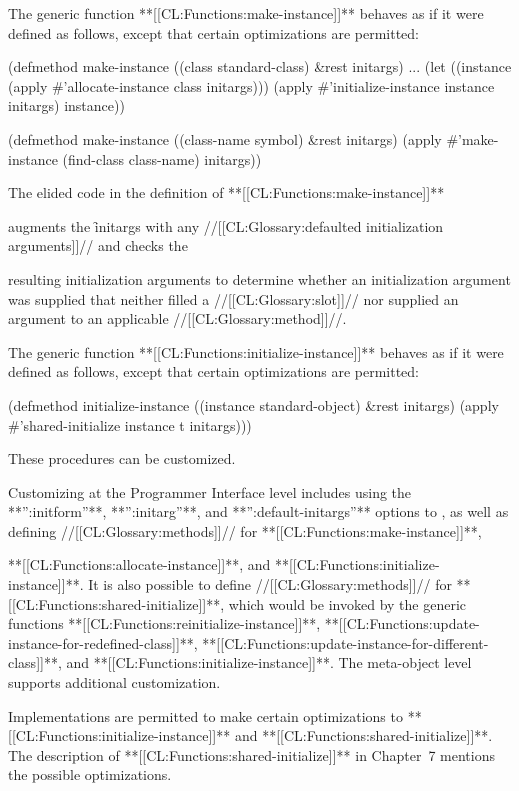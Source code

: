 \endsubsection%

                       The generic function **[[CL:Functions:make-instance]]** behaves as if it were defined as follows, except that certain optimizations are permitted:

\code
 (defmethod make-instance ((class standard-class) &rest initargs)
   ...
   (let ((instance (apply #'allocate-instance class initargs)))
     (apply #'initialize-instance instance initargs)
     instance))

 (defmethod make-instance ((class-name symbol) &rest initargs)
   (apply #'make-instance (find-class class-name) initargs)) \endcode

                                       The elided code in the definition of **[[CL:Functions:make-instance]]** 

augments the \f{initargs} with any //[[CL:Glossary:defaulted initialization arguments]]// and checks the

resulting initialization arguments to determine whether an initialization argument was supplied that neither filled a //[[CL:Glossary:slot]]// nor supplied an argument to an applicable //[[CL:Glossary:method]]//. 

                       The generic function **[[CL:Functions:initialize-instance]]** behaves as if it were defined as follows, except that certain optimizations are permitted:

\code
 (defmethod initialize-instance ((instance standard-object) &rest initargs)
   (apply #'shared-initialize instance t initargs))) \endcode

These procedures can be customized.

                                                                   Customizing at the Programmer Interface level includes using the  **'':initform''**, **'':initarg''**, and **'':default-initargs''** options to , as well as defining //[[CL:Glossary:methods]]// for **[[CL:Functions:make-instance]]**, 

**[[CL:Functions:allocate-instance]]**, and **[[CL:Functions:initialize-instance]]**.  It is also possible to define //[[CL:Glossary:methods]]// for **[[CL:Functions:shared-initialize]]**, which would be invoked by the generic functions **[[CL:Functions:reinitialize-instance]]**,  **[[CL:Functions:update-instance-for-redefined-class]]**,  **[[CL:Functions:update-instance-for-different-class]]**, and  **[[CL:Functions:initialize-instance]]**.   The meta-object level supports additional customization.

                                                                 Implementations are permitted to make certain optimizations to  **[[CL:Functions:initialize-instance]]** and **[[CL:Functions:shared-initialize]]**.   The description of **[[CL:Functions:shared-initialize]]** in Chapter~7 mentions the possible optimizations.

\endsubsection%

